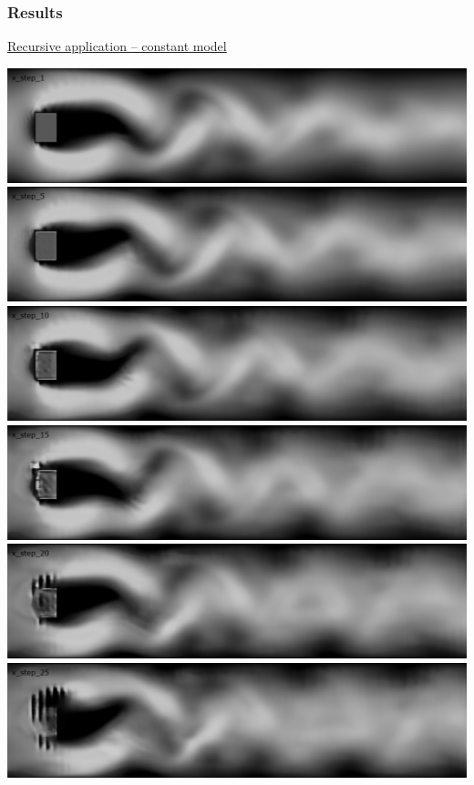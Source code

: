 \documentclass[18pt]{beamer}
\begin{document}
\begin{frame}[t]
  \frametitle{Results}
  \vspace{-1cm}
  \begin{center}
    {\large \underline{Recursive application -- constant model}} \\
  \end{center}
  \vspace{1cm}
  \begin{center}
    \includegraphics[scale=0.15]{images/res/x_step_1}
    \includegraphics[scale=0.15]{images/res/x_step_5}
    \includegraphics[scale=0.15]{images/res/x_step_10}
    \includegraphics[scale=0.15]{images/res/x_step_15}
    \includegraphics[scale=0.15]{images/res/x_step_20}
    \includegraphics[scale=0.15]{images/res/x_step_25}
  \end{center}
\end{frame}
\end{document}
